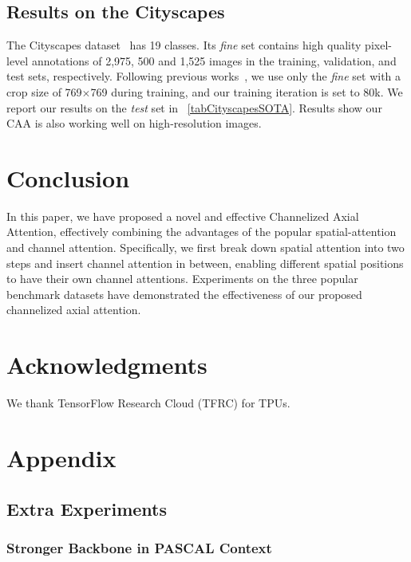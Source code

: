 \documentclass[letterpaper]{article} \usepackage{aaai22}  \usepackage{times}  \usepackage{helvet}  \usepackage{courier}  \usepackage[hyphens]{url}  \usepackage{graphicx} \urlstyle{rm} \def\UrlFont{\rm}  \usepackage{natbib}  \usepackage{caption} \DeclareCaptionStyle{ruled}{labelfont=normalfont,labelsep=colon,strut=off} \frenchspacing  \setlength{\pdfpagewidth}{8.5in}  \setlength{\pdfpageheight}{11in}  \usepackage{algorithm}
\begin{document}
\subsection{Results on the Cityscapes}

The Cityscapes dataset~\cite{cCityScapes} has 19 classes. Its \textit{fine} set contains high quality pixel-level annotations of 2,975, 500 and 1,525 images in the training, validation, and test sets, respectively.
Following previous works~\cite{cDualAttention}, we use only the \textit{fine} set with a crop size of 769$\times$769 during training, and our training iteration is set to 80k.
We report our results on the \textit{test} set in \tablename{~\ref{tabCityscapesSOTA}}. Results show our CAA is also working well on high-resolution images.



\section{Conclusion}
\label {secConclusion}

In this paper, we have proposed a novel and effective Channelized Axial Attention, effectively combining the advantages of the popular spatial-attention and channel attention. 
Specifically, we first break down spatial attention into two steps and insert channel attention in between, enabling different spatial positions to have their own channel attentions.
Experiments on the three popular benchmark datasets have demonstrated the effectiveness of our proposed channelized axial attention.

\section{Acknowledgments}
We thank TensorFlow Research Cloud (TFRC)
for TPUs.


\clearpage

\appendix

\section{Appendix}

\subsection{Extra Experiments}
\subsubsection{Stronger Backbone in PASCAL Context}
\end{document}
